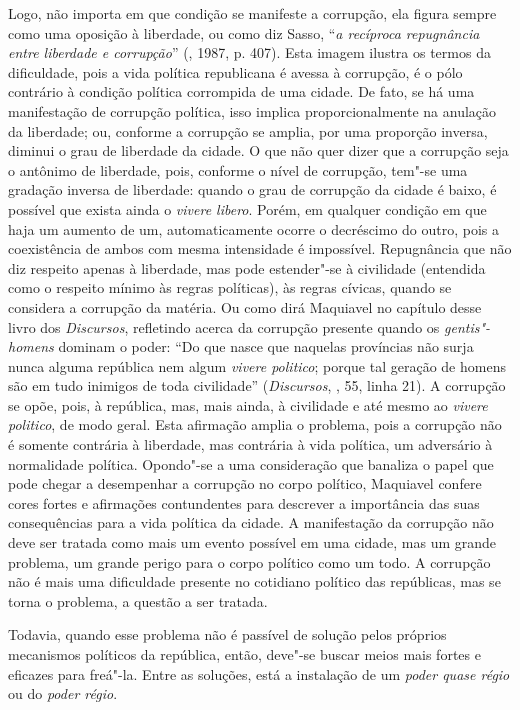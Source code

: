 Logo, não importa em que condição se manifeste a corrupção, ela figura
sempre como uma oposição à liberdade, ou como diz Sasso, ``\emph{a
recíproca repugnância entre liberdade e corrupção}'' (, 1987, p.
407). Esta imagem ilustra os termos da dificuldade, pois a vida política
republicana é avessa à corrupção, é o pólo contrário à condição política
corrompida de uma cidade. De fato, se há uma manifestação de corrupção
política, isso implica proporcionalmente na anulação da liberdade; ou,
conforme a corrupção se amplia, por uma proporção inversa, diminui o
grau de liberdade da cidade. O que não quer dizer que a corrupção seja o
antônimo de liberdade, pois, conforme o nível de corrupção, tem"-se uma
gradação inversa de liberdade: quando o grau de corrupção da cidade é
baixo, é possível que exista ainda o \emph{vivere libero}. Porém, em
qualquer condição em que haja um aumento de um, automaticamente ocorre o
decréscimo do outro, pois a coexistência de ambos com mesma intensidade
é impossível. Repugnância que não diz respeito apenas à liberdade, mas
pode estender"-se à civilidade (entendida como o respeito mínimo às
regras políticas), às regras cívicas, quando se considera a corrupção da
matéria. Ou como dirá Maquiavel no capítulo  desse livro  dos
\emph{Discursos}, refletindo acerca da corrupção presente quando os
\emph{gentis"-homens} dominam o poder: ``Do que nasce que naquelas
províncias não surja nunca alguma república nem algum \emph{vivere
politico}; porque tal geração de homens são em tudo inimigos de toda
civilidade'' (\emph{Discursos}, , 55, linha 21). A corrupção se
opõe, pois, à república, mas, mais ainda, à civilidade e até mesmo ao
\emph{vivere politico}, de modo geral. Esta afirmação amplia o problema,
pois a corrupção não é somente contrária à liberdade, mas contrária à
vida política, um adversário à normalidade política. Opondo"-se a uma
consideração que banaliza o papel que pode chegar a desempenhar a
corrupção no corpo político, Maquiavel confere cores fortes e afirmações
contundentes para descrever a importância das suas consequências para a
vida política da cidade. A manifestação da corrupção não deve ser
tratada como mais um evento possível em uma cidade, mas um grande
problema, um grande perigo para o corpo político como um todo. A
corrupção não é mais uma dificuldade presente no cotidiano político das
repúblicas, mas se torna o problema, a questão a ser tratada.

Todavia, quando esse problema não é passível de solução pelos próprios
mecanismos políticos da república, então, deve"-se buscar meios mais
fortes e eficazes para freá"-la. Entre as soluções, está a instalação de
um \emph{poder quase régio} ou do \emph{poder régio}.

